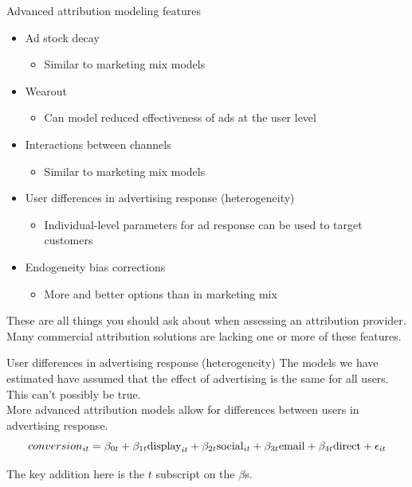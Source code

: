 \documentclass[10pt, aspectratio=169]{beamer}
\begin{document}
\begin{frame}{Advanced attribution modeling features}
\begin{itemize}
\item \alert{Ad stock decay} 
\begin{itemize}
\item Similar to marketing mix models
\end{itemize}
\item \alert{Wearout} 
\begin{itemize}
\item Can model reduced effectiveness of ads at the user level
\end{itemize}
\item \alert{Interactions between channels} 
\begin{itemize}
\item Similar to marketing mix models
\end{itemize}\item \alert{User differences} in advertising response (\alert{heterogeneity})
\begin{itemize}
\item Individual-level parameters for ad response can be used to target customers
\end{itemize}
\item \alert{Endogeneity bias corrections}
\begin{itemize}
\item More and better options than in marketing mix
\end{itemize}
\end{itemize}
\pause
These are all things you should ask about when assessing an attribution provider. \alert{Many commercial attribution solutions are lacking one or more of these features.}
\end{frame}

\begin{frame}{User differences in advertising response (heterogeneity)}
The models we have estimated have assumed that the effect of advertising is the same for all users.  This can't possibly be true. \\
\bigskip \pause
More advanced attribution models allow for differences between users in advertising response. 
\begin{equation*}
conversion_{it} = \beta_{0t} + \beta_{1t} \textnormal{display}_{it} + \beta_{2t} \textnormal{social}_{it} + \beta_{3t} \textnormal{email} + \beta_{4t} \textnormal{direct} + \epsilon_{it}
\end{equation*}
\begin{center}
\alert{The key addition here is the $t$ subscript on the $\beta$s.} 
\end{center}
\end{frame} 
\end{document}
